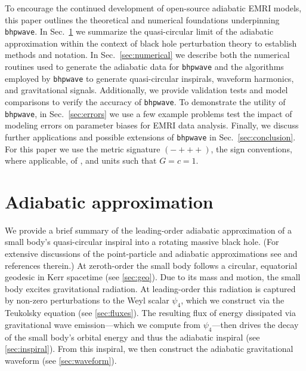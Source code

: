 \documentclass[%
 reprint,
 nofootinbib,
 amsmath,amssymb,
 aps,
 prd,
]{revtex4-2}
\begin{document}
To encourage the continued development of open-source adiabatic EMRI models, this paper outlines the theoretical and numerical foundations underpinning \texttt{bhpwave}. In Sec.~\ref{sec:adiabatic} we summarize the quasi-circular limit of the adiabatic approximation within the context of black hole perturbation theory to establish methods and notation. 
In Sec.~\ref{sec:numerical} we describe both the numerical routines used to generate the adiabatic data for \texttt{bhpwave} and the algorithms employed by \texttt{bhpwave} to generate quasi-circular inspirals, waveform harmonics, and gravitational signals. Additionally, we provide validation tests and model comparisons to verify the accuracy of \texttt{bhpwave}. To demonstrate the utility of \texttt{bhpwave}, in Sec.~\ref{sec:errors} we use a few example problems test the impact of modeling errors on parameter biases for EMRI data analysis. Finally, we discuss further applications and possible extensions of \texttt{bhpwave} in Sec.~\ref{sec:conclusion}. For this paper we use the metric signature $(-+++)$, the sign conventions, where applicable, of \cite{MisnThorWhee73}, and units such that $G=c=1$.


\section{Adiabatic approximation}
\label{sec:adiabatic}

We provide a brief summary of the leading-order adiabatic approximation of a small body's quasi-circular inspiral into a rotating massive black hole. (For extensive discussions of the point-particle and adiabatic approximations see \cite{Hugh00b, Mino03, DrasHugh06, HughETC21} and references therein.) At zeroth-order the small body follows a circular, equatorial geodesic in Kerr spacetime (see \ref{sec:geo}). Due to its mass and motion, the small body excites gravitational radiation. At leading-order this radiation is captured by non-zero perturbations to the Weyl scalar $\psi_4$, which we construct via the Teukolsky equation (see \ref{sec:fluxes}). The resulting flux of energy dissipated via gravitational wave emission---which we compute from $\psi_4$---then drives the decay of the small body's orbital energy and thus the adiabatic inspiral (see \ref{sec:inspiral}). From this inspiral, we then construct the adiabatic gravitational waveform (see \ref{sec:waveform}).
\end{document}
